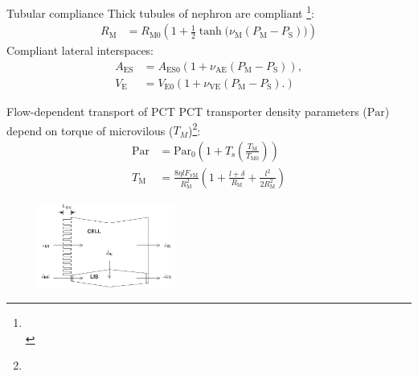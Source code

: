\documentclass{beamer}
\begin{document}
\begin{frame}{Tubular compliance}
    Thick tubules of nephron are compliant \citep{Weinstein2007,Weinstein2015}\footnote[frame,1]{\tiny{\\ }}:
    \begin{align}
        R_\mathrm{M}&=R_{\mathrm{M}0}\left(1+\frac{1}{2}\tanh\big(\nu_\mathrm{M}(P_\mathrm{M}-P_\mathrm{S})\big)\right)
    \end{align}
    Compliant lateral interspaces:
    \begin{align}
        A_\mathrm{ES} &=A_{\mathrm{ES}0}\left(1+\nu_\mathrm{AE}(P_\mathrm{M}-P_\mathrm{S})\right),\\
        V_\mathrm{E} &=V_{\mathrm{E}0}\left(1+\nu_\mathrm{VE}(P_\mathrm{M}-P_\mathrm{S}).\right)
    \end{align}
\end{frame}

\begin{frame}{Flow-dependent transport of PCT}
    PCT transporter density parameters ($\mathrm{Par}$) depend on torque of microvilous ($T_M$)\citep{Weinstein2007}\footnote[frame,1]{\tiny{}}:
    \begin{align}
        \mathrm{Par} &= \mathrm{Par}_0\left(1+T_\mathrm{s}\left(\frac{T_\mathrm{M}}{T_{\mathrm{M}0}}\right)\right)\\
        T_\mathrm{M} &= \frac{8\eta l F_{\mathrm{vM}}}{R_\mathrm{M}^2}\left(1+\frac{l+\delta}{R_\mathrm{M}}+\frac{l^2}{2R^2_\mathrm{M}}\right)
    \end{align}
    \begin{figure}
        \centering
        \includegraphics[width=0.4\textwidth]{figures/PCT_epithelium.png}
    \end{figure}
\end{frame}
\end{document}

